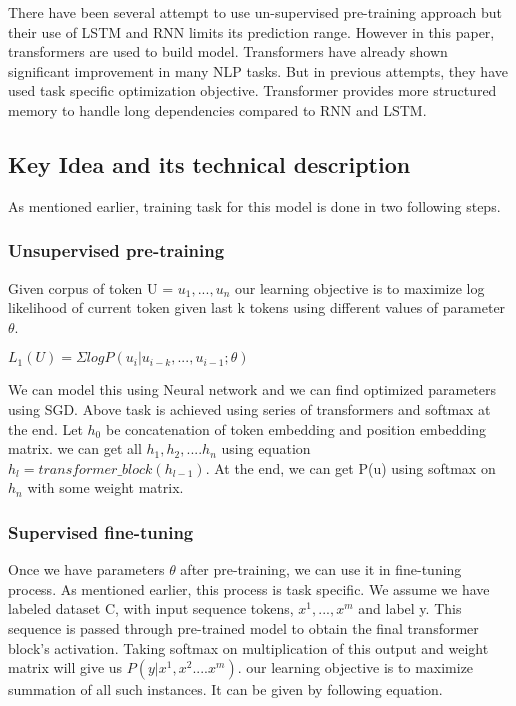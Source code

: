 \documentclass[11pt,a4paper]{article}
\begin{document}
There have been several attempt to use un-supervised pre-training approach but their use of LSTM and RNN limits its prediction range. However in this paper, transformers are used to build model. Transformers have already shown significant improvement in many NLP tasks. But in previous attempts, they have used task specific optimization objective. Transformer provides more structured memory to handle long dependencies compared to RNN and LSTM. 


\subsection{Key Idea and its technical description}
As mentioned earlier, training task for this model is done in two following steps.

\subsubsection{Unsupervised pre-training}

Given corpus of token U = $u_{1}, . . . , u_{n}$ our learning objective is to maximize log likelihood of current token given last k tokens using different values of parameter $\theta$. 

$ L_{1}(U) =\Sigma{logP(u_{i}|u_{i−k},...,u_{i−1};\theta)}$

We can model this using Neural network and we can find optimized parameters using SGD.
Above task is achieved using series of transformers and softmax at the end. Let $h_{0}$ be concatenation of token embedding and position embedding matrix. we can get all $h_{1},h_{2},....h_{n}$  using equation $ h_{l}= transformer\_block(h_{l-1})$. At the end, we can get P(u) using softmax on $h_{n}$ with some weight matrix.


\subsubsection{Supervised fine-tuning}
Once we have parameters $\theta$ after pre-training, we can use it in fine-tuning process. 
As mentioned earlier, this process is task specific. We assume we have labeled dataset C, with input sequence tokens, $x^{1}, . . . , x^{m}$ and label y. This sequence is passed through  pre-trained model to obtain the final transformer block’s activation. Taking softmax on multiplication of this output and weight matrix will give us $P(y| x^{1}, x^{2}....x^{m})$. our learning objective is to maximize summation of all such instances. It can be given by following equation.
\end{document}
